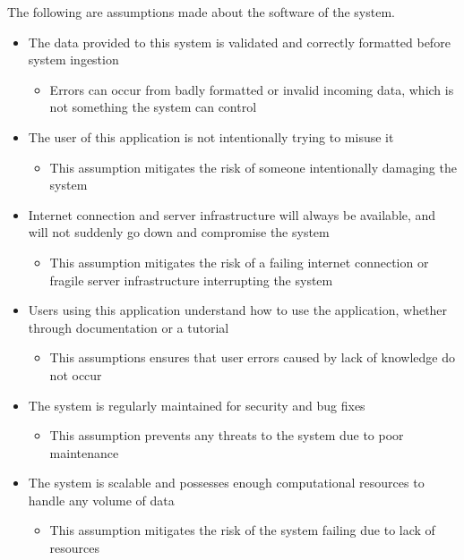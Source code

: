 \documentclass{article}
\begin{document}
The following are assumptions made about the software of the system. 
\begin{itemize}
    \item The data provided to this system is validated and correctly formatted
    before system ingestion
    \begin{itemize}
        \item Errors can occur from badly formatted or invalid incoming data,
        which is not something the system can control
    \end{itemize}
    \item The user of this application is not intentionally trying to misuse it
    \begin{itemize}
        \item This assumption mitigates the risk of someone intentionally
        damaging the system
    \end{itemize}
    \item Internet connection and server infrastructure will always be
    available, and will not suddenly go down and compromise the system
    \begin{itemize}
        \item This assumption mitigates the risk of a failing internet
        connection or fragile server infrastructure interrupting the system
    \end{itemize}
    \item Users using this application understand how to use the application,
    whether through documentation or a tutorial
    \begin{itemize}
        \item This assumptions ensures that user errors caused by lack of
        knowledge do not occur
    \end{itemize}
    \item The system is regularly maintained for security and bug fixes
    \begin{itemize}
        \item This assumption prevents any threats to the system due to poor
        maintenance
    \end{itemize}
    \item The system is scalable and possesses enough computational resources to
    handle any volume of data
    \begin{itemize}
        \item This assumption mitigates the risk of the system failing due to
        lack of resources
    \end{itemize}
\end{itemize}
\end{document}
